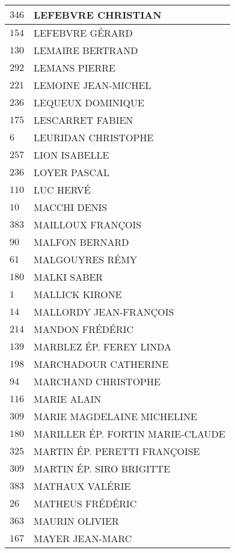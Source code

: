 \begin{xltabular}{\linewidth}{|l|X|}
    \hline
    $346$ & LEFEBVRE CHRISTIAN \\
    \hline
    $154$ & LEFEBVRE GÉRARD \\
    \hline
    $130$ & LEMAIRE BERTRAND \\
    \hline
    $292$ & LEMANS PIERRE \\
    \hline
    $221$ & LEMOINE JEAN-MICHEL \\
    \hline
    $236$ & LEQUEUX DOMINIQUE \\
    \hline
    $175$ & LESCARRET FABIEN \\
    \hline
    $6$ & LEURIDAN CHRISTOPHE \\
    \hline
    $257$ & LION ISABELLE \\
    \hline
    $236$ & LOYER PASCAL \\
    \hline
    $110$ & LUC HERVÉ \\
    \hline
    $10$ & MACCHI DENIS \\
    \hline
    $383$ & MAILLOUX FRANÇOIS \\
    \hline
    $90$ & MALFON BERNARD \\
    \hline
    $61$ & MALGOUYRES RÉMY \\
    \hline
    $180$ & MALKI SABER \\
    \hline
    $1$ & MALLICK KIRONE \\
    \hline
    $14$ & MALLORDY JEAN-FRANÇOIS \\
    \hline
    $214$ & MANDON FRÉDÉRIC \\
    \hline
    $139$ & MARBLEZ ÉP. FEREY LINDA \\
    \hline
    $198$ & MARCHADOUR CATHERINE \\
    \hline
    $94$ & MARCHAND CHRISTOPHE \\
    \hline
    $116$ & MARIE ALAIN \\
    \hline
    $309$ & MARIE MAGDELAINE MICHELINE \\
    \hline
    $180$ & MARILLER ÉP. FORTIN MARIE-CLAUDE \\
    \hline
    $325$ & MARTIN ÉP. PERETTI FRANÇOISE \\
    \hline
    $309$ & MARTIN ÉP. SIRO BRIGITTE \\
    \hline
    $383$ & MATHAUX VALÉRIE \\
    \hline
    $26$ & MATHEUS FRÉDÉRIC \\
    \hline
    $363$ & MAURIN OLIVIER \\
    \hline
    $167$ & MAYER JEAN-MARC \\
    \hline

\end{xltabular}
